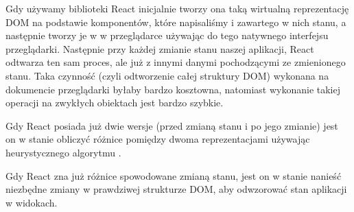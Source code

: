 \begin{description}
  Gdy używamy biblioteki React inicjalnie tworzy ona taką wirtualną reprezentację DOM na podstawie komponentów, które napisaliśmy i zawartego w nich stanu, a następnie tworzy je w w przeglądarce używając do tego natywnego interfejsu przeglądarki. Następnie przy każdej zmianie stanu naszej aplikacji, React odtwarza ten sam proces, ale już z innymi danymi pochodzącymi ze zmienionego stanu. Taka czynność (czyli odtworzenie całej struktury DOM) wykonana na dokumencie przeglądarki byłaby bardzo kosztowna, natomiast wykonanie takiej operacji na zwykłych obiektach jest bardzo szybkie. 

  Gdy React posiada już dwie wersje (przed zmianą stanu i po jego zmianie) jest on w stanie obliczyć różnice pomiędzy dwoma reprezentacjami używając heurystycznego algorytmu \cite{ref_heuristic_diffing_algorythm}.

  Gdy React zna już różnice spowodowane zmianą stanu, jest on w stanie nanieść niezbędne zmiany w prawdziwej strukturze DOM, aby odwzorować stan aplikacji w widokach.
\end{description}

